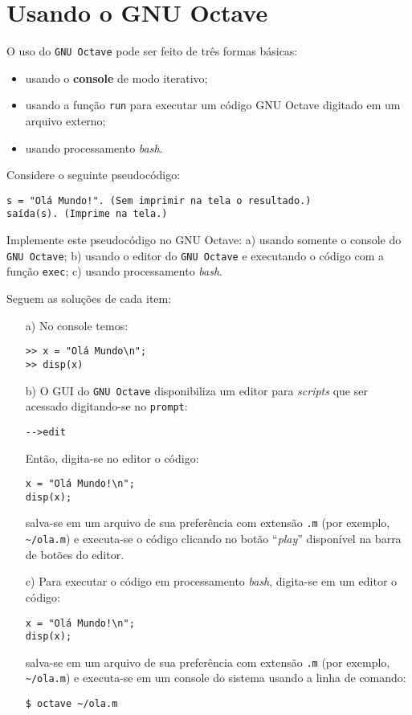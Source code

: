 \section{Usando o GNU Octave}

O uso do \verb+GNU Octave+ pode ser feito de três formas básicas:
\begin{itemize}
\item usando o {\bf console} de modo iterativo;
\item usando a função \verb+run+ para executar um código GNU Octave digitado em um arquivo externo;
\item usando processamento {\it bash}.
\end{itemize}

\begin{ex}
  Considere o seguinte pseudocódigo:
\begin{verbatim}
s = "Olá Mundo!". (Sem imprimir na tela o resultado.)
saída(s). (Imprime na tela.)
\end{verbatim}
Implemente este pseudocódigo no GNU Octave: a) usando somente o console do \verb+GNU Octave+; b) usando o editor do \verb+GNU Octave+ e executando o código com a função \verb+exec+; c) usando processamento {\it bash}.
\end{ex}
\begin{sol} Seguem as soluções de cada item:
  \begin{itemize}
  \item[a)]  No console temos:
\begin{verbatim}
>> x = "Olá Mundo\n";
>> disp(x)
\end{verbatim}
  \item[b)] O GUI do \verb+GNU Octave+ disponibiliza um editor para {\it scripts} que ser acessado digitando-se no \verb+prompt+:
\begin{verbatim}
-->edit
\end{verbatim}
Então, digita-se no editor o código:
\begin{verbatim}
x = "Olá Mundo!\n";
disp(x);
\end{verbatim}
salva-se em um arquivo de sua preferência com extensão \verb+.m+ (por exemplo, \verb+~/ola.m+) e executa-se o código clicando no botão ``{\it play}'' disponível na barra de botões do editor.
\item[c)] Para executar o código em processamento {\it bash}, digita-se em um editor o código:
\begin{verbatim}
x = "Olá Mundo!\n";
disp(x);
\end{verbatim}
salva-se em um arquivo de sua preferência com extensão \verb+.m+ (por exemplo, \verb+~/ola.m+) e executa-se em um console do sistema usando a linha de comando:
\begin{verbatim}
$ octave ~/ola.m
\end{verbatim}
\end{itemize}
\end{sol}

